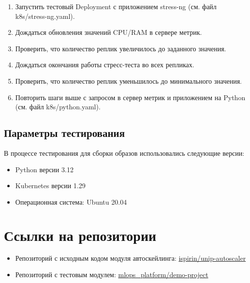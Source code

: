 \documentclass[a4paper]{article}
\begin{document}
\begin{enumerate}
  \item Запустить тестовый Deployment с приложением stress-ng (см.
    файл k8s/stress-ng.yaml).
  \item Дождаться обновления значений CPU/RAM в сервере метрик.
  \item Проверить, что количество реплик увеличилось до заданного значения.
  \item Дождаться окончания работы стресс-теста во всех репликах.
  \item Проверить, что количество реплик уменьшилось до
    минимального значения.
  \item Повторить шаги выше с запросом в сервер метрик и
    приложением на Python
    (см. файл k8s/python.yaml).
\end{enumerate}

\subsection{Параметры тестирования}

В процессе тестирования для сборки образов использовались следующие версии:

\begin{itemize}
  \item Python версии 3.12
  \item Kubernetes версии 1.29
  \item Операционная система: Ubuntu 20.04
\end{itemize}

\section{Ссылки на репозитории}

\begin{itemize}
  \item Репозиторий с исходным кодом модуля автоскейлинга:
    \href{https://platform.stratpro.hse.ru/forgejo/ispirin/unip-autoscaler}{ispirin/unip-autoscaler}
  \item Репозиторий с тестовым модулем:
    \href{https://platform.stratpro.hse.ru/forgejo/mlops_platform/demo-project}{mlops\_platform/demo-project}
\end{itemize}
\end{document}
